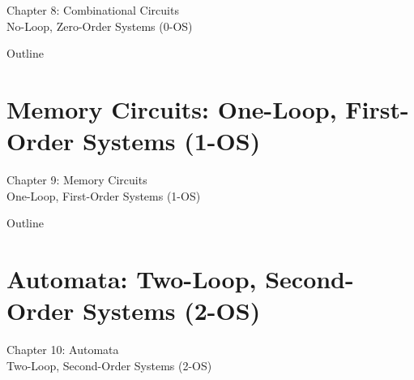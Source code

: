 \documentclass[aspectratio=169,11pt]{beamer}
\begin{document}
\begin{frame}
\begin{center}
{\Huge Chapter 8: Combinational Circuits}\\[0.5cm]
{\Large No-Loop, Zero-Order Systems (0-OS)}\\[0.5cm]
\end{center}
\end{frame}

\begin{frame}{Outline}
\tableofcontents[sections=2]
\end{frame}


\section{Memory Circuits: One-Loop, First-Order Systems (1-OS)}

\begin{frame}
\begin{center}
{\Huge Chapter 9: Memory Circuits}\\[0.5cm]
{\Large One-Loop, First-Order Systems (1-OS)}\\[0.5cm]
\end{center}
\end{frame}

\begin{frame}{Outline}
\tableofcontents[sections=3]
\end{frame}


\section{Automata: Two-Loop, Second-Order Systems (2-OS)}

\begin{frame}
\begin{center}
{\Huge Chapter 10: Automata}\\[0.5cm]
{\Large Two-Loop, Second-Order Systems (2-OS)}\\[0.5cm]
\end{center}
\end{frame}
\end{document}
